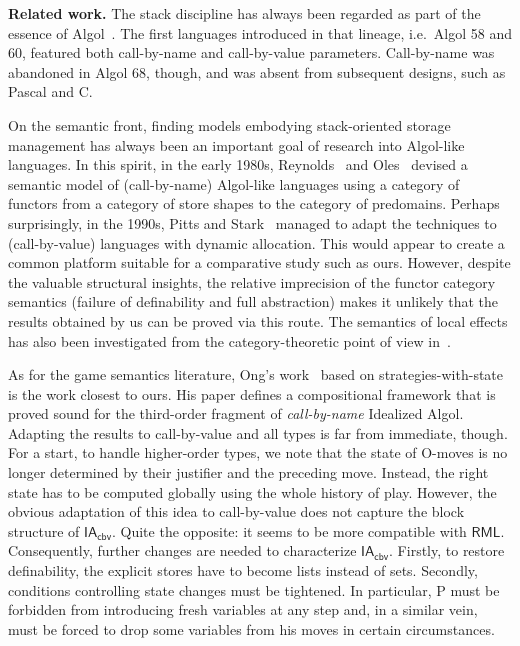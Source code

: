 \documentclass{CSML}
\theoremstyle{definition}\newtheorem{definition}[thm]{Definition}
\theoremstyle{definition}\newtheorem{example}[thm]{Example}
\theoremstyle{definition}\newtheorem{proposition}[thm]{Proposition}
\theoremstyle{definition}\newtheorem{lemma}[thm]{Lemma}
\theoremstyle{definition}\newtheorem{theorem}[thm]{Theorem}
\theoremstyle{definition}\newtheorem{corollary}[thm]{Corollary}
\theoremstyle{definition}\newtheorem{remark}[thm]{Remark}
\newcommand\nt[1]{#1}
\newcommand{\nada}{$\text{}$}
\newcommand\iacbv{\mathsf{IA}_{\mathsf{cbv}}}
\newcommand\rml{\mathsf{RML}}
\begin{document}
\nada\\
\noindent
{\bf Related work.} The stack discipline has always been regarded as part of the essence
of Algol~\cite{Rey81}. \nt{The first languages introduced in that lineage, i.e.\ Algol 58 and 60, 
featured both call-by-name and call-by-value parameters. Call-by-name was abandoned in Algol 68, 
though, and was absent from subsequent designs, such as Pascal and C.
}

On the semantic front, finding models embodying stack-oriented storage management
has always been an important goal of research into Algol-like languages.
In this spirit, in the early 1980s, Reynolds~\cite{Rey81} and Oles~\cite{Ole85} devised a semantic
model of \nt{(call-by-name)} Algol-like languages using a category of functors from a category of store shapes
to the category of predomains. Perhaps surprisingly, in the 1990s, Pitts and Stark~\cite{PS93,Sta95}
managed to adapt the techniques to \nt{(call-by-value)} languages with dynamic allocation.
This would appear to create a common platform suitable for a comparative study
such as ours.  However, despite the valuable structural insights, the relative
imprecision of the functor category semantics (failure of definability and full abstraction)
makes it unlikely that the results obtained by us can be proved via this route.
The semantics of local effects has also been investigated from the category-theoretic
point of view in~\cite{Pow06}.


As for the game semantics literature, Ong's work~\cite{Ong02} based on strategies-with-state
is the work closest to ours. His paper defines a compositional framework that is proved sound
for the third-order fragment of \emph{call-by-name} Idealized Algol. Adapting the results to call-by-value
and all types is far from immediate, though. For a start, to handle higher-order types, we note that
the state of O-moves is no longer determined by their justifier and the preceding move.
Instead, the right state has to be computed globally using the whole history
of play. However, the obvious adaptation of this idea to call-by-value does not capture
the block structure of $\iacbv$. Quite the opposite: it seems to be more compatible with $\rml$.
Consequently,  further changes are needed to characterize $\iacbv$. Firstly,
to restore definability, the explicit stores have to become lists instead of sets.
Secondly, conditions controlling state changes must be tightened. In particular,
P must be forbidden from introducing fresh variables at any step and,  in a similar vein,
must be forced to drop some variables from his moves in certain circumstances.
\end{document}
